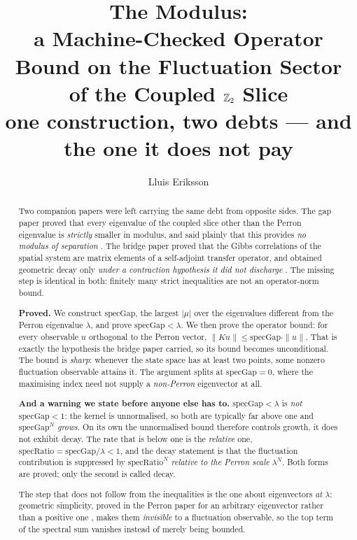 \documentclass[11pt]{article}
\title{The Modulus:\\
a Machine-Checked Operator Bound on the Fluctuation Sector\\
of the Coupled $\mathbb{Z}_2$ Slice\\
\large one construction, two debts --- and the one it does not pay}
\author{Lluis Eriksson}
\date{}
\theoremstyle{definition}
\begin{document}
\maketitle

\begin{abstract}
Two companion papers were left carrying the same debt from opposite sides.  The
gap paper proved that every eigenvalue of the coupled slice other than the
Perron eigenvalue is \emph{strictly} smaller in modulus, and said plainly that
this provides \emph{no modulus of separation} \cite{ErikssonGap}.  The bridge
paper proved that the Gibbs correlations of the spatial system are matrix
elements of a self-adjoint transfer operator, and obtained geometric decay only
\emph{under a contraction hypothesis it did not discharge} \cite{ErikssonGibbs}.
The missing step is identical in both: finitely many strict inequalities are not
an operator-norm bound.

\textbf{Proved.}  We construct $\mathrm{specGap}$, the largest $|\mu|$ over the
eigenvalues different from the Perron eigenvalue $\lambda$, and prove
$\mathrm{specGap} < \lambda$.  We then prove the operator bound: for every
observable $u$ orthogonal to the Perron vector,
$\|Ku\| \le \mathrm{specGap}\cdot\|u\|$.  That is exactly the hypothesis the
bridge paper carried, so its bound becomes unconditional.  The bound is
\emph{sharp}: whenever the state space has at least two points, some nonzero
fluctuation observable attains it.  The argument splits at
$\mathrm{specGap}=0$, where the maximising index need not supply a
\emph{non-Perron} eigenvector at all.

\textbf{And a warning we state before anyone else has to.}  $\mathrm{specGap}
<\lambda$ is \emph{not} $\mathrm{specGap}<1$: the kernel is unnormalised, so
both are typically far above one and $\mathrm{specGap}^{N}$ \emph{grows}.  On
its own the unnormalised bound therefore controls growth, it does not exhibit
decay.  The rate that is below one is the \emph{relative} one,
$\mathrm{specRatio}=\mathrm{specGap}/\lambda<1$, and the decay statement is
that the fluctuation contribution is suppressed by $\mathrm{specRatio}^{N}$
\emph{relative to the Perron scale} $\lambda^{N}$.  Both forms are proved; only
the second is called decay.

The step that does not follow from the inequalities is the one about
eigenvectors \emph{at} $\lambda$: geometric simplicity, proved in the Perron
paper for an arbitrary eigenvector rather than a positive one
\cite{ErikssonPerron}, makes them \emph{invisible} to a fluctuation observable,
so the top term of the spectral sum vanishes instead of merely being bounded.


\end{abstract}
\end{document}
